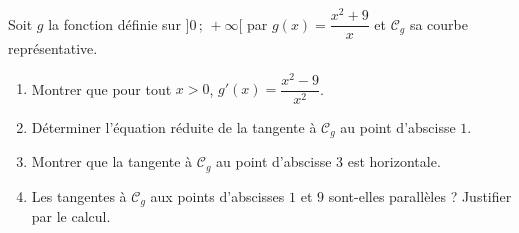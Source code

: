 \documentclass[11pt]{article}
\begin{document}
\begin{exercice}
Soit $g$ la fonction définie sur $]0\,;\,+\infty[$ par $g(x)=\dfrac{x^{2}+9}{x}$ et $\mathcal{C}_{g}$ sa courbe représentative.
\begin{enumerate}
\item Montrer que pour tout $x>0$, $g'(x)=\dfrac{x^{2}-9}{x^{2}}$.
\item Déterminer l'équation réduite de la tangente à $\mathcal{C}_{g}$ au point d'abscisse $1$.
\item Montrer que la tangente à $\mathcal{C}_{g}$ au point d'abscisse $3$ est horizontale.
\item Les tangentes à $\mathcal{C}_{g}$ aux points d'abscisses $1$ et $9$ sont-elles parallèles ? Justifier par le calcul.
\end{enumerate}
\end{exercice}
\end{document}
